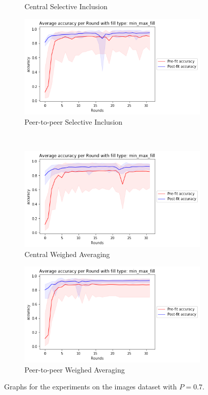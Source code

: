 \documentclass[12pt]{article}
\begin{document}
\begin{figure}[H]
\begin{subfigure}{0.45\textwidth}
    \caption{Central Selective Inclusion}
\end{subfigure}
\begin{subfigure}{0.45\textwidth}
    \raggedleft
    \includegraphics[width=\textwidth]{resources/posture_stdround_p2p-0.7-accuracy.png}
    \caption{Peer-to-peer Selective Inclusion}
\end{subfigure}
\\
\begin{subfigure}{0.45\textwidth}
    \raggedleft
    \includegraphics[width=\textwidth]{resources/posture_weightround-0.7-accuracy.png}
    \caption{Central Weighed Averaging}
\end{subfigure}
\begin{subfigure}{0.45\textwidth}
    \raggedleft
    \includegraphics[width=\textwidth]{resources/posture_weightround_p2p-0.7-accuracy.png}
    \caption{Peer-to-peer Weighed Averaging}
\end{subfigure}
\caption{Graphs for the experiments on the images dataset with $P = 0.7$.}\label{fig:images_graphs_biased}
\end{figure}
\end{document}
